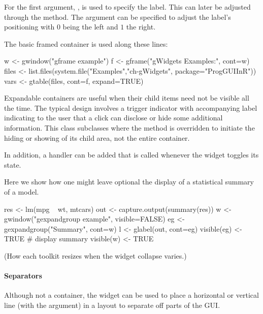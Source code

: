 For  the first argument, , is
used to specify the label. This can later be adjusted through the
 method. The argument
 can be specified to adjust the label's
positioning with $0$ being the left and $1$ the right.



The basic framed container is used along these lines:
\begin{Schunk}
\begin{Sinput}
 w <- gwindow("gframe example")
 f <- gframe("gWidgets Examples:", cont=w)
 files <- list.files(system.file("Examples","ch-gWidgets", 
                                 package="ProgGUIInR"))
 vars <- gtable(files, cont=f, expand=TRUE)
\end{Sinput}
\end{Schunk}


Expandable containers are useful when their child items need not be
visible all the time. The typical design involves a trigger indicator
with accompanying label indicating to the user that a click can
disclose or hide some additional information. This class subclasses
 where the  method
is overridden to initiate the hiding or showing of its child area, not
the entire container.

In addition, a handler can be added that is called whenever the widget
toggles its state.

Here we show how one might leave optional the display of a statistical
summary of a model.
\begin{Schunk}
\begin{Sinput}
 res <- lm(mpg ~ wt, mtcars)
 out <- capture.output(summary(res))
 w <- gwindow("gexpandgroup example", visible=FALSE)
 eg <- gexpandgroup("Summary", cont=w)
 l <- glabel(out, cont=eg)
 visible(eg) <- TRUE                     # display summary
 visible(w) <- TRUE
\end{Sinput}
\end{Schunk}

(How each toolkit resizes when the widget collapse varies.)

\paragraph{Separators}
Although not a container, the  widget can be
used to place a horizontal or vertical line (with the
 argument) in a layout to separate off parts of
the GUI. 




